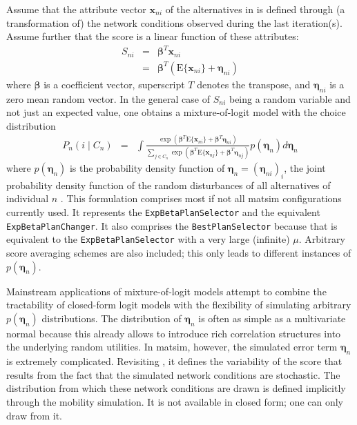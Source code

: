 Assume that the attribute vector $\mathbf{x}_{ni}$ of the alternatives in 
is defined through (a transformation of) the network conditions observed
during the last iteration(s). Assume further that the score is a linear
function of these attributes:
\begin{eqnarray}
S_{ni} & = & \boldsymbol{\beta}^{T}\mathbf{x}_{ni}\\
 & = & \boldsymbol{\beta}^{T}(\text{E}\{\mathbf{x}_{ni}\}+\boldsymbol{\eta}_{ni})\label{eq:score}
\end{eqnarray}
where $\boldsymbol{\beta}$ is a coefficient vector, superscript $T$ denotes the transpose,
and $\boldsymbol{\eta}_{ni}$ is a zero mean random vector. 
In the general case of $S_{ni}$ being a random
variable and not just an expected value, one obtains a mixture-of-logit
model with the choice distribution
\begin{eqnarray}
P_{n}(i\mid C_{n}) & = & 
\int\frac{\exp\left(\boldsymbol{\beta}^{T}\text{E}\{\mathbf{x}_{ni}\}+\boldsymbol{\beta}^{T}\boldsymbol{\eta}_{ni}\right)}
{\sum_{j\in C_{n}}\exp\left(\boldsymbol{\beta}^{T}\text{E}\{\mathbf{x}_{nj}\}+\boldsymbol{\beta}^{T}\boldsymbol{\eta}_{nj}\right)}
p(\boldsymbol{\eta}_{n})d\boldsymbol{\eta}_{n}\label{eq:mixture-of-logit}
\end{eqnarray}
where $p(\boldsymbol{\eta}_{n})$ is the probability density function of 
$\boldsymbol{\eta}_{n}=(\boldsymbol{\eta}_{ni})_i$, 
\ie the joint probability
density function of the random disturbances of all alternatives of individual $n$
\citep{Train_2003}. This formulation comprises most if not all \gls{matsim}
configurations currently used. It represents the \lstinline{ExpBetaPlanSelector}
and the equivalent \lstinline{ExpBetaPlanChanger}. It also comprises
the \lstinline{BestPlanSelector} because that is equivalent to the \lstinline{ExpBetaPlanSelector}
with a very large (infinite) $\mu$. Arbitrary score averaging schemes
are also included; this only leads to different instances of $p(\boldsymbol{\eta}_{n})$.

Mainstream applications of mixture-of-logit models attempt to combine
the tractability of closed-form logit models with the flexibility of
simulating arbitrary $p(\boldsymbol{\eta}_n)$ distributions.
The distribution of $\boldsymbol{\eta}_n$ is often as simple as a multivariate normal
because this already allows to introduce rich correlation structures
into the underlying random utilities. In \gls{matsim}, however, the simulated
error term $\boldsymbol{\eta}_n$ is extremely complicated. Revisiting ,
it defines the variability of the score that results from the fact
that the simulated network conditions are stochastic. The distribution
from which these network conditions are drawn is defined implicitly
through the mobility simulation. It is not available in closed form;
one can only draw from it.

